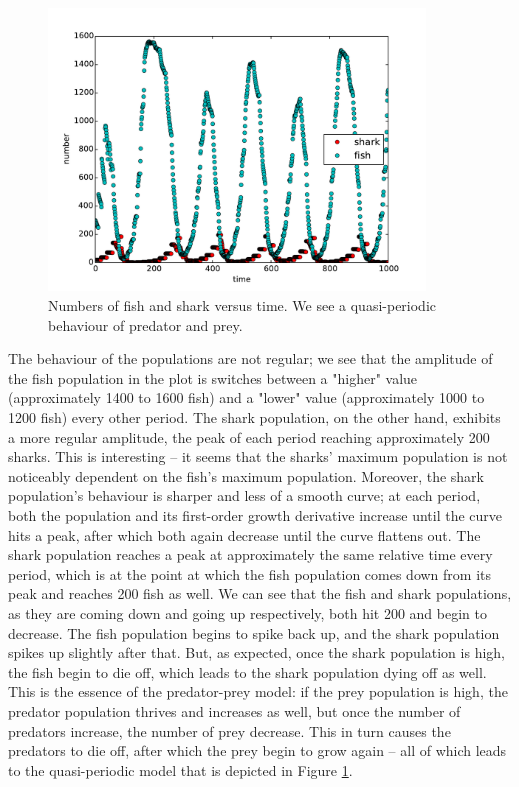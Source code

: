 \documentclass{article}
\begin{document}
\begin{figure}[H]
\centering
\captionsetup{justification=centering, margin=3 cm}
\includegraphics[width=10cm]{PP.pdf}
\caption{Numbers of fish and shark versus time. We see a quasi-periodic behaviour of predator and prey.}
\label{fig:graph}
\end{figure}
The behaviour of the populations are not regular; we see that the amplitude of the fish population in the plot is switches between a "higher" value (approximately 1400 to 1600 fish) and a "lower" value (approximately 1000 to 1200 fish) every other period. The shark population, on the other hand, exhibits a more regular amplitude, the peak of each period reaching approximately 200 sharks. This is interesting -- it seems that the sharks' maximum population is not noticeably dependent on the fish's maximum population. Moreover, the shark population's behaviour is sharper and less of a smooth curve; at each period, both the population and its first-order growth derivative increase until the curve hits a peak, after which both again decrease until the curve flattens out. The shark population reaches a peak at approximately the same relative time every period, which is at the point at which the fish population comes down from its peak and reaches 200 fish as well. We can see that the fish and shark populations, as they are coming down and going up respectively, both hit 200 and begin to decrease. The fish population begins to spike back up, and the shark population spikes up slightly after that. But, as expected, once the shark population is high, the fish begin to die off, which leads to the shark population dying off as well. This is the essence of the predator-prey model: if the prey population is high, the predator population thrives and increases as well, but once the number of predators increase, the number of prey decrease. This in turn causes the predators to die off, after which the prey begin to grow again -- all of which leads to the quasi-periodic model that is depicted in Figure \ref{fig:graph}.\par 
\end{document}
